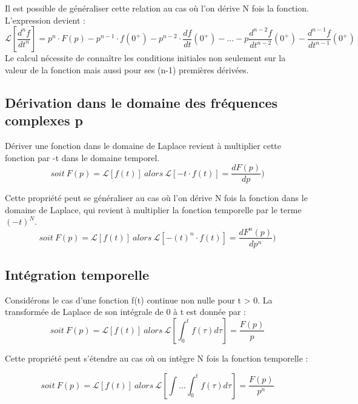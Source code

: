 	Il est possible de généraliser cette relation au cas où l'on dérive N
	fois la fonction. L'expression devient :
	\begin{equation}\label{key}
	\mathcal{L}[\frac{d^{n}f}{dt^{n}}] = p^{n}\cdot F(p)-p^{n-1}\cdot f(0^{+})-p^{n-2}\cdot \frac{df}{dt}(0^{+})-...-p\frac{d^{n-2}f}{dt^{n-2}}(0^{+})-\frac{d^{n-1}f}{dt^{n-1}}(0^{+})
	\end{equation}
	Le calcul nécessite de connaître les conditions initiales non seulement sur la valeur de la fonction mais aussi pour ses (n-1) premières dérivées.
	
	\subsection{Dérivation dans le domaine des fréquences complexes p}
	Dériver une fonction dans le domaine de Laplace revient à multiplier cette fonction par -t dans le domaine temporel.
	\begin{equation}\label{key}
		soit~F(p)=\mathcal{L}[f(t)]~alors~\mathcal{L}[-t\cdot f(t)] = \frac{dF(p)}{dp})
	\end{equation}
	
	Cette propriété peut se généraliser au cas où l'on dérive N fois la fonction dans le domaine de Laplace, qui revient à multiplier la fonction temporelle par le terme $(-t)^{N}$.
	\begin{equation}\label{key}
	soit~F(p)=\mathcal{L}[f(t)]~alors~\mathcal{L}[-(t)^{n}\cdot f(t)] = \frac{dF^{n}(p)}{dp^{n}})
	\end{equation}
	
	
	\subsection{Intégration temporelle}
	Considérons le cas d'une fonction f(t) continue non nulle pour t > 0. La transformée de Laplace de son intégrale de 0 à t est donnée par :
	\begin{equation}\label{key}
		soit~F(p)=\mathcal{L}[f(t)]~alors~\mathcal{L}[\int_{0}^{t}f(\tau)d\tau]=\frac{F(p)}{p}	
	\end{equation}
	
	Cette propriété peut s'étendre au cas où on intègre N fois la fonction temporelle :
	
	\begin{equation}\label{key}
	soit~F(p)=\mathcal{L}[f(t)]~alors~\mathcal{L}[\int ... \int_{0}^{t}f(\tau)d\tau]=\frac{F(p)}{p^{n}}	
	\end{equation}
	

